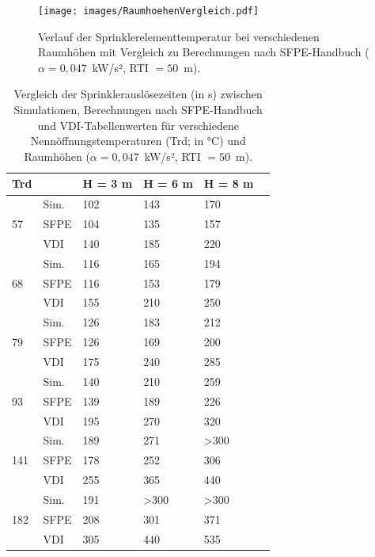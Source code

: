 \begin{figure}
    \centering
    \texttt{[image: images/RaumhoehenVergleich.pdf]}
    \caption{Verlauf der Sprinklerelementtemperatur bei verschiedenen Raumhöhen mit Vergleich zu Berechnungen nach SFPE-Handbuch ($\alpha=0{,}047$~kW/s², RTI $=50$~m).}
    \label{fig:RaumhoehenVergleich}
\end{figure}

\begin{table}\centering
\caption{Vergleich der Sprinklerauslösezeiten (in s) zwischen Simulationen, Berechnungen nach SFPE-Handbuch und VDI-Tabellenwerten für verschiedene Nennöffnungstemperaturen (Trd; in °C)  und Raumhöhen ($\alpha=0{,}047$~kW/s², RTI $=50$~m).}
\label{tab:RaumhoeheErgebnisse}
\begin{tabu} to 0.7 \toprule
Trd    &        &H = 3 m  & H = 6 m          & H = 8 m          \\
        \midrule
            & Sim.      & 102   & 143              & 170              \\
 57         & SFPE      & 104   & 135              & 157              \\
            & VDI       & 140   & 185              & 220              \\
          \midrule
            & Sim.      & 116   & 165              & 194              \\
 68         & SFPE      & 116   & 153              & 179              \\
            & VDI       & 155   & 210              & 250              \\
          \midrule
            & Sim.      & 126   & 183              & 212              \\
79          & SFPE      & 126   & 169              & 200              \\
            & VDI       & 175   & 240              & 285              \\
          \midrule
            & Sim.      & 140   & 210              & 259              \\
 93         & SFPE      & 139   & 189              & 226              \\
            & VDI       & 195   & 270              & 320              \\
          \midrule
            & Sim.      & 189   & 271              & \textgreater 300 \\
  141       & SFPE      & 178   & 252              & 306              \\
            & VDI       & 255   & 365              & 440              \\
          \midrule
            & Sim.      & 191   & \textgreater 300 & \textgreater 300         \\
 182        & SFPE      & 208   & 301              & 371            \\
            & VDI       & 305   & 440              & 535            \\
        \bottomrule
\end{tabu}
\end{table}

